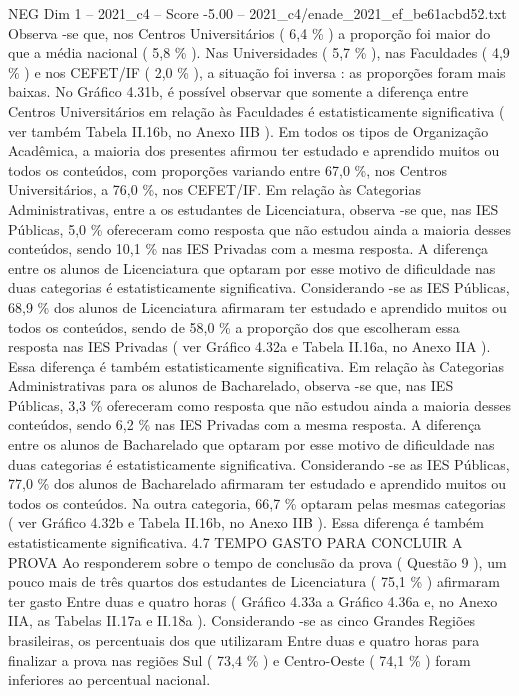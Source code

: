 \begin{textsample}{NEG Dim 1 – 2021\_c4 – Score -5.00 – 2021\_c4/enade\_2021\_ef\_be61acbd52.txt}
Observa -se que, nos Centros Universitários ( 6,4 \% ) a proporção foi maior do que a média nacional ( 5,8 \% ).
Nas Universidades ( 5,7 \% ), nas Faculdades ( 4,9 \% ) e nos CEFET/IF ( 2,0 \% ), a situação foi inversa : as proporções foram mais baixas.
No Gráfico 4.31b, é possível observar que somente a diferença entre Centros Universitários em relação às Faculdades é estatisticamente significativa ( ver também Tabela II.16b, no Anexo IIB ).
Em todos os tipos de Organização Acadêmica, a maioria dos presentes afirmou ter estudado e aprendido muitos ou todos os conteúdos, com proporções variando entre 67,0 \%, nos Centros Universitários, a 76,0 \%, nos CEFET/IF.
Em relação às Categorias Administrativas, entre a os estudantes de Licenciatura, observa -se que, nas IES Públicas, 5,0 \% ofereceram como resposta que não estudou ainda a maioria desses conteúdos, sendo 10,1 \% nas IES Privadas com a mesma resposta.
A diferença entre os alunos de Licenciatura que optaram por esse motivo de dificuldade nas duas categorias é estatisticamente significativa.
Considerando -se as IES Públicas, 68,9 \% dos alunos de Licenciatura afirmaram ter estudado e aprendido muitos ou todos os conteúdos, sendo de 58,0 \% a proporção dos que escolheram essa resposta nas IES Privadas ( ver Gráfico 4.32a e Tabela II.16a, no Anexo IIA ).
Essa diferença é também estatisticamente significativa.
Em relação às Categorias Administrativas para os alunos de Bacharelado, observa -se que, nas IES Públicas, 3,3 \% ofereceram como resposta que não estudou ainda a maioria desses conteúdos, sendo 6,2 \% nas IES Privadas com a mesma resposta.
A diferença entre os alunos de Bacharelado que optaram por esse motivo de dificuldade nas duas categorias é estatisticamente significativa.
Considerando -se as IES Públicas, 77,0 \% dos alunos de Bacharelado afirmaram ter estudado e aprendido muitos ou todos os conteúdos.
Na outra categoria, 66,7 \% optaram pelas mesmas categorias ( ver Gráfico 4.32b e Tabela II.16b, no Anexo IIB ).
Essa diferença é também estatisticamente significativa. 4.7 TEMPO GASTO PARA CONCLUIR A PROVA Ao responderem sobre o tempo de conclusão da prova ( Questão 9 ), um pouco mais de três quartos dos estudantes de Licenciatura ( 75,1 \% ) afirmaram ter gasto Entre duas e quatro horas ( Gráfico 4.33a a Gráfico 4.36a e, no Anexo IIA, as Tabelas II.17a e II.18a ).
Considerando -se as cinco Grandes Regiões brasileiras, os percentuais dos que utilizaram Entre duas e quatro horas para finalizar a prova nas regiões Sul ( 73,4 \% ) e Centro-Oeste ( 74,1 \% ) foram inferiores ao percentual nacional.

\end{textsample}
